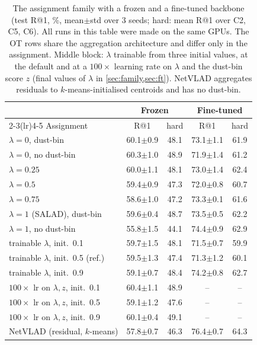 \begin{table}[t]
\centering
\caption{The assignment family with a frozen and a fine-tuned backbone (test R@1, \%, mean$\pm$std over 3 seeds; hard: mean R@1 over C2, C5, C6). All runs in this table were made on the same GPUs. The OT rows share the aggregation architecture and differ only in the assignment. Middle block: $\lambda$ trainable from three initial values, at the default and at a $100\times$ learning rate on $\lambda$ and the dust-bin score $z$ (final values of $\lambda$ in \cref{sec:family,sec:ft}). NetVLAD aggregates residuals to $k$-means-initialised centroids and has no dust-bin.}
\label{tab:family}
\footnotesize
\setlength{\tabcolsep}{3pt}
\begin{tabular}{@{}lcccc@{}}
\toprule
& \multicolumn{2}{c}{Frozen} & \multicolumn{2}{c}{Fine-tuned} \\
\cmidrule(lr){2-3}\cmidrule(lr){4-5}
Assignment & R@1 & hard & R@1 & hard \\
\midrule
$\lambda=0$, dust-bin & 60.1{\scriptsize$\pm$0.9} & 48.1 & 73.1{\scriptsize$\pm$1.1} & 61.9 \\
$\lambda=0$, no dust-bin & 60.3{\scriptsize$\pm$1.0} & 48.9 & 71.9{\scriptsize$\pm$1.4} & 61.2 \\
$\lambda=0.25$ & 60.0{\scriptsize$\pm$1.1} & 48.1 & 73.0{\scriptsize$\pm$1.4} & 62.4 \\
$\lambda=0.5$ & 59.4{\scriptsize$\pm$0.9} & 47.3 & 72.0{\scriptsize$\pm$0.8} & 60.7 \\
$\lambda=0.75$ & 58.6{\scriptsize$\pm$1.0} & 47.2 & 73.3{\scriptsize$\pm$0.1} & 61.6 \\
$\lambda=1$ (SALAD), dust-bin & 59.6{\scriptsize$\pm$0.4} & 48.7 & 73.5{\scriptsize$\pm$0.5} & 62.2 \\
$\lambda=1$, no dust-bin & 55.8{\scriptsize$\pm$1.5} & 44.1 & 74.4{\scriptsize$\pm$0.9} & 62.9 \\
\midrule
trainable $\lambda$, init.\ 0.1 & 59.7{\scriptsize$\pm$1.5} & 48.1 & 71.5{\scriptsize$\pm$0.7} & 59.9 \\
trainable $\lambda$, init.\ 0.5 (ref.) & 59.5{\scriptsize$\pm$1.3} & 47.4 & 71.3{\scriptsize$\pm$1.2} & 60.1 \\
trainable $\lambda$, init.\ 0.9 & 59.1{\scriptsize$\pm$0.7} & 48.4 & 74.2{\scriptsize$\pm$0.8} & 62.7 \\
\quad $100\times$ lr on $\lambda,z$, init.\ 0.1 & 60.4{\scriptsize$\pm$1.1} & 48.9 & -- & -- \\
\quad $100\times$ lr on $\lambda,z$, init.\ 0.5 & 59.1{\scriptsize$\pm$1.2} & 47.6 & -- & -- \\
\quad $100\times$ lr on $\lambda,z$, init.\ 0.9 & 60.1{\scriptsize$\pm$0.4} & 49.1 & -- & -- \\
\midrule
NetVLAD (residual, $k$-means) & 57.8{\scriptsize$\pm$0.7} & 46.3 & 76.4{\scriptsize$\pm$0.7} & 64.3 \\
\bottomrule
\end{tabular}
\end{table}